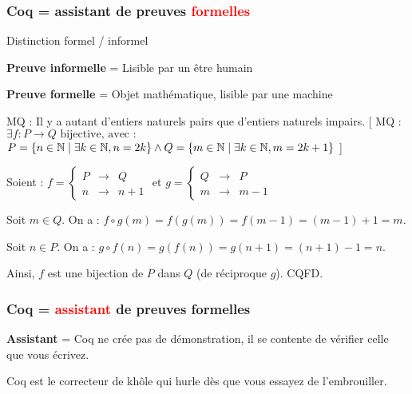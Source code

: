 \documentclass[9pt,handout]{beamer}
\newenvironment{ex}[1][Exemple]{\begin{exampleblock}{#1}}{\end{exampleblock}}
\newcommand{\defi}[1]{\textbf{#1}}
\begin{document}
\begin{frame}[t]
\frametitle{Coq = assistant de preuves \textcolor{red}{formelles}}

Distinction formel / informel

\pause
\defi{Preuve informelle} = Lisible par un être humain

\pause[\ctpinform]
\pause
\defi{Preuve formelle} = Objet mathématique, lisible par une machine 
\begin{ex}[MQ : Il y a autant d'entiers naturels pairs que d'entiers naturels impairs.]
\pause
{}[ MQ : $\exists f : P \rightarrow Q \text{ bijective, avec : }$\\$P = \{n \in \mathbb{N} \mid \exists k \in \mathbb{N}, n = 2k\} \wedge Q = \{m \in \mathbb{N} \mid \exists k \in \mathbb{N}, m = 2k+1\}$ ]



\pause
Soient :
$f = \left\{\begin{array}{ccc}
  P & \rightarrow & Q \\
  n & \rightarrow & n + 1
\end{array}\right.$
et
$g = \left\{\begin{array}{ccc}
  Q & \rightarrow & P \\
  m & \rightarrow & m - 1
\end{array}\right.$

\pause
Soit $m \in Q$. On a : $f \circ g (m) = f(g(m)) = f(m - 1) = (m - 1) + 1 = m$.

Soit $n \in P$. On a : $g \circ f (n) = g(f(n)) = g(n + 1) = (n + 1) - 1 = n$.

Ainsi, $f$ est une bijection de $P$ dans $Q$ (de réciproque $g$). CQFD.
\end{ex}
\end{frame}



\begin{frame}
\frametitle{Coq = \textcolor{red}{assistant} de preuves formelles}

\defi{Assistant} = Coq ne crée pas de démonstration, il se contente de vérifier celle que vous écrivez.

\bigskip
Coq est le correcteur de khôle qui hurle dès que vous essayez de l'embrouiller.
\end{frame}
\end{document}
